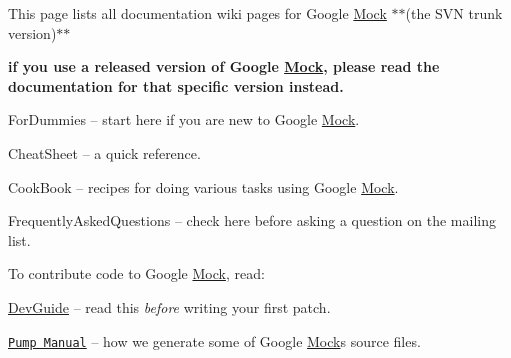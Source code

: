 This page lists all documentation wiki pages for Google \hyperlink{class_mock}{Mock} $\ast$$\ast$(the S\+VN trunk version)$\ast$$\ast$
\begin{DoxyItemize}
\item {\bfseries if you use a released version of Google \hyperlink{class_mock}{Mock}, please read the documentation for that specific version instead.}
\begin{DoxyItemize}
\item For\+Dummies -- start here if you are new to Google \hyperlink{class_mock}{Mock}.
\item Cheat\+Sheet -- a quick reference.
\item Cook\+Book -- recipes for doing various tasks using Google \hyperlink{class_mock}{Mock}.
\item Frequently\+Asked\+Questions -- check here before asking a question on the mailing list.
\end{DoxyItemize}
\end{DoxyItemize}

To contribute code to Google \hyperlink{class_mock}{Mock}, read\+:


\begin{DoxyItemize}
\item \hyperlink{googletest_2docs_2_dev_guide_8md}{Dev\+Guide} -- read this {\itshape before} writing your first patch.
\item \href{http://code.google.com/p/googletest/wiki/PumpManual}{\tt Pump Manual} -- how we generate some of Google \hyperlink{class_mock}{Mock}\textquotesingle{}s source files. 
\end{DoxyItemize}